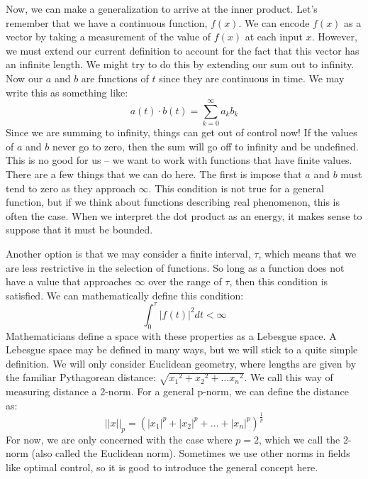 
Now, we can make a generalization to arrive at the inner product. Let's remember that we have a continuous function, $f(x)$. We can encode $f(x)$ as a vector by taking a measurement of the value of $f(x)$ at each input $x$. However, we must extend our current definition to account for the fact that this vector has an infinite length. We might try to do this by extending our sum out to infinity. Now our $a$ and $b$ are functions of $t$ since they are continuous in time. We may write this as something like:
$$a(t)\cdot b(t)=\sum_{k=0}^{\infty}{a_kb_k}$$
Since we are summing to infinity, things can get out of control now! If the values of $a$ and $b$ never go to zero, then the sum will go off to infinity and be undefined. This is no good for us -- we want to work with functions that have finite values. There are a few things that we can do here. The first is impose that $a$ and $b$ must tend to zero as they approach $\infty$. This condition is not true for a general function, but if we think about functions describing real phenomenon, this is often the case. When we interpret the dot product as an energy, it makes sense to suppose that it must be bounded.

Another option is that we may consider a finite interval, $\tau$, which means that we are less restrictive in the selection of functions. So long as a function does not have a value that approaches $\infty$ over the range of $\tau$, then this condition is satisfied. We can mathematically define this condition:
$$\int_0^\tau{|f(t)|^2}dt<\infty$$
Mathematicians define a space with these properties as a Lebesgue space. A Lebesgue space may be defined in many ways, but we will stick to a quite simple definition. We will only consider Euclidean geometry, where lengths are given by the familiar Pythagorean distance: $\sqrt{{x_1}^2+{x_2}^2+\dots {x_n}^2}$. We call this way of measuring distance a 2-norm. For a general p-norm, we can define the distance as:
$$||x||_p=\left({|x_1|}^p+{|x_2|}^p+\dots+{|x_n|}^p\right)^{\frac{1}{p}}$$
For now, we are only concerned with the case where $p=2$, which we call the 2-norm (also called the Euclidean norm). Sometimes we use other norms in fields like optimal control, so it is good to introduce the general concept here.

